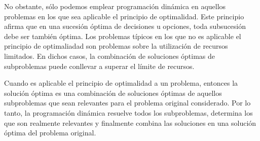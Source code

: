 No obstante, sólo podemos emplear programación dinámica en aquellos problemas en los que sea aplicable el principio de optimalidad. Este principio afirma que en una sucesión óptima de decisiones u opciones, toda subsucesión debe ser también óptima. Los problemas típicos en los que no es aplicable el principio de optimaliadad son problemas sobre la utilización de recursos limitados. En dichos casos, la combinación de soluciones óptimas de subproblemas puede conllevar a superar el límite de recursos.

Cuando es aplicable el principio de optimalidad a un problema, entonces la solución óptima es una combinación de soluciones óptimas de aquellos subproblemas que sean relevantes para el problema original considerado. Por lo tanto, la programación dinámica resuelve todos los subproblemas, determina los que son realmente relevantes y finalmente combina las soluciones en una solución óptima del problema original.